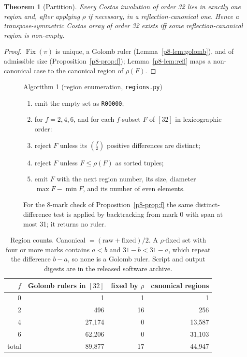 \documentclass[11pt,a4paper,oneside]{report}
\newtheorem{theorem}{Theorem}[chapter]
\theoremstyle{definition}
\newcommand{\Fix}{\operatorname{Fix}}
\newcommand{\code}[1]{\texttt{#1}}
\begin{document}
\begin{theorem}[Partition]\label{p8-thm:partition}
Every Costas involution of order 32 lies in exactly one region and, after applying $\rho$ if
necessary, in a reflection-canonical one. Hence a transpose-symmetric Costas array of order
32 exists iff some reflection-canonical region is non-empty.
\end{theorem}
\begin{proof}
$\Fix(\pi)$ is unique, a Golomb ruler (Lemma~\ref{p8-lem:golomb}), and of admissible size
(Proposition~\ref{p8-prop:f}); Lemma~\ref{p8-lem:refl} maps a non-canonical case to the canonical
region of $\rho(F)$.
\end{proof}

\begin{figure}[H]
\centering
\begin{minipage}{0.9\linewidth}
\small
Algorithm 1 (region enumeration, \code{regions.py})\label{p8-alg:enum}
\begin{enumerate}[nosep, label=\arabic*.]
\item emit the empty set as \code{R00000};
\item for $f=2,4,6$, and for each $f$-subset $F$ of $[32]$ in lexicographic order:
\item \quad reject $F$ unless its $\binom{f}{2}$ positive differences are distinct;
\item \quad reject $F$ unless $F\le\rho(F)$ as sorted tuples;
\item \quad emit $F$ with the next region number, its size, diameter $\max F-\min F$, and
its number of even elements.
\end{enumerate}
For the 8-mark check of Proposition~\ref{p8-prop:f} the same distinct-difference test is applied
by backtracking from mark 0 with span at most 31; it returns no ruler.
\end{minipage}
\end{figure}

\begin{table}[H]
\centering
\begin{tabular}{@{}rrrr@{}}
\toprule
$f$ & Golomb rulers in $[32]$ & fixed by $\rho$ & canonical regions \\
\midrule
0 & 1 & 1 & 1 \\
2 & 496 & 16 & 256 \\
4 & 27{,}174 & 0 & 13{,}587 \\
6 & 62{,}206 & 0 & 31{,}103 \\
\midrule
total & 89{,}877 & 17 & 44{,}947 \\
\bottomrule
\end{tabular}
\caption{Region counts. Canonical $=(\text{raw}+\text{fixed})/2$. A $\rho$-fixed set with
four or more marks contains $a<b$ and $31-b<31-a$, which repeat the difference $b-a$, so
none is a Golomb ruler. Script and output digests are in the released software archive.}
\label{p8-tab:regions}
\end{table}
\end{document}
